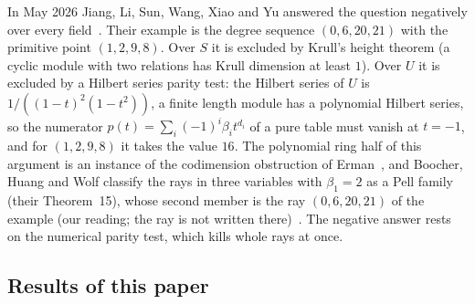 \documentclass[11pt]{article}
\theoremstyle{definition}
\theoremstyle{remark}
\begin{document}
In May 2026 Jiang, Li, Sun, Wang, Xiao and Yu answered the question negatively over every field~\cite[Theorem~3.7]{JLSWXY}. Their example is the degree sequence $(0,6,20,21)$ with the primitive point $(1,2,9,8)$. Over $S$ it is excluded by Krull's height theorem (a cyclic module with two relations has Krull dimension at least $1$). Over $U$ it is excluded by a Hilbert series parity test: the Hilbert series of $U$ is $1/((1-t)^2(1-t^2))$, a finite length module has a polynomial Hilbert series, so the numerator $p(t)=\sum_i(-1)^i\beta_it^{d_i}$ of a pure table must vanish at $t=-1$, and for $(1,2,9,8)$ it takes the value $16$. The polynomial ring half of this argument is an instance of the codimension obstruction of Erman~\cite[Proposition~3.1]{Erman09}, and Boocher, Huang and Wolf classify the rays in three variables with $\beta_1=2$ as a Pell family (their Theorem~15), whose second member is the ray $(0,6,20,21)$ of the example (our reading; the ray is not written there)~\cite{BHW}. The negative answer rests on the numerical parity test, which kills whole rays at once.

\subsection{Results of this paper}
\label{sec:results-list}
\end{document}
